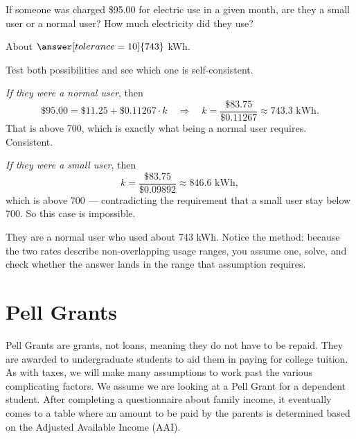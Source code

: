 \documentclass[12pt]{ximera}
\begin{document}
\begin{problem}
If someone was charged \$95.00 for electric use in a given month, are they a small user
or a normal user? How much electricity did they use?

About $\answer[tolerance=10]{743}$ kWh.

\begin{freeResponse}
\end{freeResponse}

\begin{solution}
Test both possibilities and see which one is self-consistent.

\emph{If they were a normal user}, then
\[
\$95.00 = \$11.25 + \$0.11267 \cdot k
\quad\Longrightarrow\quad
k = \frac{\$83.75}{\$0.11267} \approx 743.3 \text{ kWh}.
\]
That is above 700, which is exactly what being a normal user requires. Consistent.

\emph{If they were a small user}, then
\[
k = \frac{\$83.75}{\$0.09892} \approx 846.6 \text{ kWh},
\]
which is above 700 --- contradicting the requirement that a small user stay below 700.
So this case is impossible.

They are a normal user who used about 743 kWh. Notice the method: because the two rates
describe non-overlapping usage ranges, you assume one, solve, and check whether the
answer lands in the range that assumption requires.
\end{solution}
\end{problem}

\section*{Pell Grants}

Pell Grants are grants, not loans, meaning they do not have to be repaid. They are
awarded to undergraduate students to aid them in paying for college tuition. As with
taxes, we will make many assumptions to work past the various complicating factors. We
assume we are looking at a Pell Grant for a dependent student. After completing a
questionnaire about family income, it eventually comes to a table where an amount to be
paid by the parents is determined based on the Adjusted Available Income (AAI).
\end{document}
